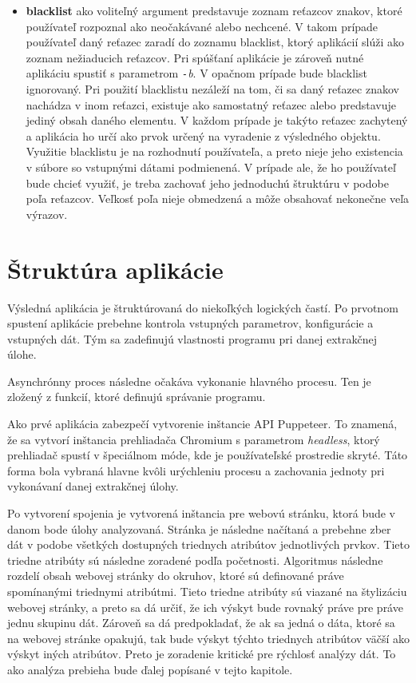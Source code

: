 \begin{itemize}
  \item \textbf{blacklist} ako voliteľný argument predstavuje zoznam reťazcov znakov, ktoré používateľ rozpoznal ako neočakávané alebo nechcené. V takom prípade používateľ daný reťazec zaradí do zoznamu blacklist, ktorý aplikácií slúži ako zoznam nežiaducich reťazcov. Pri spúšťaní aplikácie je zároveň nutné aplikáciu spustiť s parametrom \textit{\texttt{-}b}. V opačnom prípade bude blacklist ignorovaný. Pri použití blacklistu nezáleží na tom, či sa daný reťazec znakov nachádza v inom reťazci, existuje ako samostatný reťazec alebo predstavuje jediný obsah daného elementu. V každom prípade je takýto reťazec zachytený a aplikácia ho určí ako prvok určený na vyradenie z výsledného objektu. Využitie blacklistu je na rozhodnutí používateľa, a preto nieje jeho existencia v súbore so vstupnými dátami podmienená. V prípade ale, že ho používateľ bude chcieť využiť, je treba zachovať jeho jednoduchú štruktúru v podobe poľa reťazcov. Veľkosť poľa nieje obmedzená a môže obsahovať nekonečne veľa výrazov. 
 \end{itemize}
 
 \section{Štruktúra aplikácie}
 
 Výsledná aplikácia je štruktúrovaná do niekoľkých logických častí. Po prvotnom spustení aplikácie prebehne kontrola vstupných parametrov, konfigurácie a vstupných dát. Tým sa zadefinujú vlastnosti programu pri danej extrakčnej úlohe.
 
 Asynchrónny proces následne očakáva vykonanie hlavného procesu. Ten je zložený z funkcií, ktoré definujú správanie programu. 
 
 Ako prvé aplikácia zabezpečí vytvorenie inštancie API Puppeteer. To znamená, že sa vytvorí inštancia prehliadača Chromium s parametrom \textit{headless}, ktorý prehliadač spustí v špeciálnom móde, kde je používateľské prostredie skryté. Táto forma bola vybraná hlavne kvôli urýchleniu procesu a zachovania jednoty pri vykonávaní danej extrakčnej úlohy. 
 
 Po vytvorení spojenia je vytvorená inštancia pre webovú stránku, ktorá bude v danom bode úlohy analyzovaná. Stránka je následne načítaná a prebehne zber dát v podobe všetkých dostupných triednych atribútov jednotlivých prvkov. Tieto triedne atribúty sú následne zoradené podľa početnosti. Algoritmus následne rozdelí obsah webovej stránky do okruhov, ktoré sú definované práve spomínanými triednymi atribútmi. Tieto triedne atribúty sú viazané na štylizáciu webovej stránky, a preto sa dá určiť, že ich výskyt bude rovnaký práve pre práve jednu skupinu dát. Zároveň sa dá predpokladať, že ak sa jedná o dáta, ktoré sa na webovej stránke opakujú, tak bude výskyt týchto triednych atribútov väčší ako výskyt iných atribútov. Preto je zoradenie kritické pre rýchlosť analýzy dát. To ako analýza prebieha bude ďalej popísané v tejto kapitole.
 
